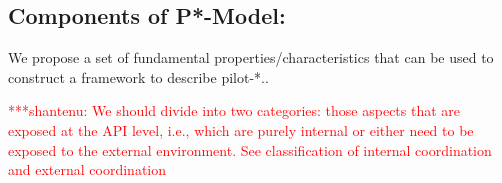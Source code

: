 \documentclass[conference,final]{IEEEtran}
\newcommand{\jhanote}[1]{ {\textcolor{red} { ***shantenu: #1 }}}
\newcommand{\jhanote}[1]{}
\begin{document}
% 
% 


\subsection{Components of P*-Model:}

We propose a set of fundamental properties/characteristics that can be
used to construct a framework to describe pilot-*..

\jhanote{We should divide into two categories: those aspects that are
  exposed at the API level, i.e., which are purely internal or either
  need to be exposed to the external environment. See classification
  of internal coordination and external coordination}
\end{document}
